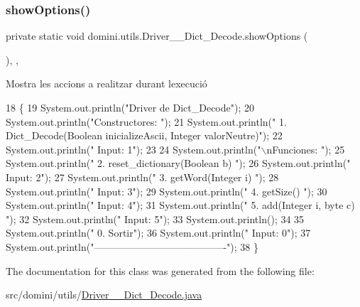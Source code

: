 \subsubsection{\texorpdfstring{show\+Options()}{showOptions()}}
{\footnotesize\ttfamily private static void domini.\+utils.\+Driver\+\_\+\+\_\+\+Dict\+\_\+\+Decode.\+show\+Options (\begin{DoxyParamCaption}{ }\end{DoxyParamCaption})\hspace{0.3cm}{\ttfamily [inline]}, {\ttfamily [static]}, {\ttfamily [private]}}



Mostra les accions a realitzar durant l\textquotesingle{}execució 


\begin{DoxyCode}
18                                      \{
19         System.out.println(\textcolor{stringliteral}{"Driver de Dict\_Decode"});
20         System.out.println(\textcolor{stringliteral}{"Constructores: "});
21         System.out.println(\textcolor{stringliteral}{"     1. Dict\_Decode(Boolean inicializeAscii, Integer valorNeutre)"});
22         System.out.println(\textcolor{stringliteral}{"     Input: 1"});
23 
24         System.out.println(\textcolor{stringliteral}{"\(\backslash\)nFunciones: "});
25         System.out.println(\textcolor{stringliteral}{"     2. reset\_dictionary(Boolean b) "});
26         System.out.println(\textcolor{stringliteral}{"     Input: 2"});
27         System.out.println(\textcolor{stringliteral}{"     3. getWord(Integer i) "});
28         System.out.println(\textcolor{stringliteral}{"     Input: 3"});
29         System.out.println(\textcolor{stringliteral}{"     4. getSize() "});
30         System.out.println(\textcolor{stringliteral}{"     Input: 4"});
31         System.out.println(\textcolor{stringliteral}{"     5. add(Integer i, byte c) "});
32         System.out.println(\textcolor{stringliteral}{"     Input: 5"});
33         System.out.println();
34 
35         System.out.println(\textcolor{stringliteral}{"     0. Sortir"});
36         System.out.println(\textcolor{stringliteral}{"     Input: 0"});
37         System.out.println(\textcolor{stringliteral}{"----------------------------------------"});
38     \}
\end{DoxyCode}


The documentation for this class was generated from the following file\+:\begin{DoxyCompactItemize}
\item 
src/domini/utils/\hyperlink{Driver____Dict__Decode_8java}{Driver\+\_\+\+\_\+\+Dict\+\_\+\+Decode.\+java}\end{DoxyCompactItemize}
